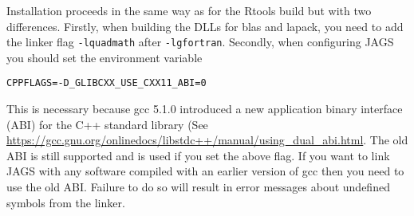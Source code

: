 \documentclass[11pt, a4paper, titlepage]{article}
\begin{document}
Installation proceeds in the same way as for the Rtools build but with
two differences.  Firstly, when building the DLLs for blas and lapack,
you need to add the linker flag \verb+-lquadmath+ after
\verb+-lgfortran+. Secondly, when configuring JAGS you should set the
environment variable
\begin{verbatim}
CPPFLAGS=-D_GLIBCXX_USE_CXX11_ABI=0 
\end{verbatim}
This is necessary because gcc 5.1.0 introduced a new application
binary interface (ABI) for the C++ standard library (See
\url{https://gcc.gnu.org/onlinedocs/libstdc++/manual/using_dual_abi.html}. The
old ABI is still supported and is used if you set the above flag. If
you want to link JAGS with any software compiled with an earlier
version of gcc then you need to use the old ABI. Failure to do so will
result in error messages about undefined symbols from the linker.
\end{document}
